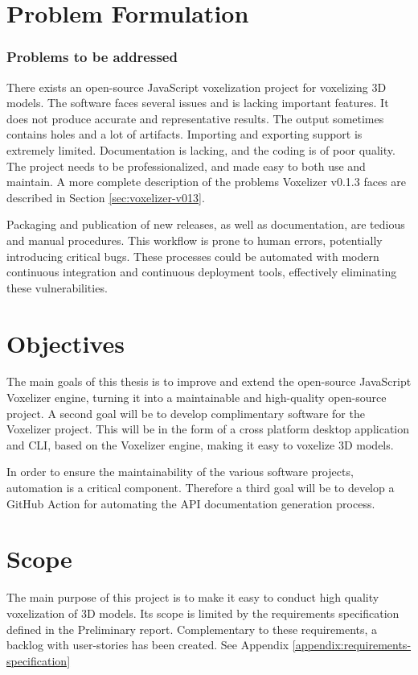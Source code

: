 \section{Problem Formulation}

\subsubsection{Problems to be addressed}
There exists an open-source JavaScript voxelization project for voxelizing 3D models. The software faces several issues and is lacking important features. It does not produce accurate and representative results. The output sometimes contains holes and a lot of artifacts. Importing and exporting support is extremely limited. Documentation is lacking, and the coding is of poor quality. The project needs to be professionalized, and made easy to both use and maintain.
A more complete description of the problems Voxelizer v0.1.3 faces are described in Section \ref{sec:voxelizer-v013}.

Packaging and publication of new releases, as well as documentation, are tedious and manual procedures. This workflow is prone to human errors, potentially introducing critical bugs. These processes could be automated with modern continuous integration and continuous deployment tools, effectively eliminating these vulnerabilities.

\section{Objectives}
The main goals of this thesis is to improve and extend the open-source JavaScript Voxelizer engine, turning it into a maintainable and high-quality open-source project. A second goal will be to develop complimentary software for the Voxelizer project. This will be in the form of a cross platform desktop application and CLI, based on the Voxelizer engine, making it easy to voxelize 3D models.

In order to ensure the maintainability of the various software projects, automation is a critical component. Therefore a third goal will be to develop a GitHub Action for automating the API documentation generation process.

\section{Scope}
The main purpose of this project is to make it easy to conduct high quality voxelization of 3D models. Its scope is limited by the requirements specification defined in the Preliminary report. Complementary to these requirements, a backlog with user-stories has been created. See Appendix \ref{appendix:requirements-specification}

